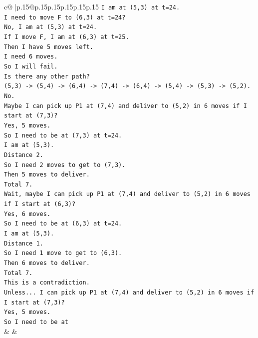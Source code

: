 \documentclass{article}
\begin{document}
{\begin{supertabular}{c@{$\;$}|p{.15\linewidth}@{}p{.15\linewidth}p{.15\linewidth}p{.15\linewidth}p{.15\linewidth}p{.15\linewidth}}
{{{\texttt{I am at (5,3) at t=24.} \\
\texttt{I need to move F to (6,3) at t=24?} \\
\texttt{No, I am at (5,3) at t=24.} \\
\texttt{If I move F, I am at (6,3) at t=25.} \\
\texttt{Then I have 5 moves left.} \\
\texttt{I need 6 moves.} \\
\texttt{So I will fail.} \\
\texttt{Is there any other path?} \\
\texttt{(5,3) {-}> (5,4) {-}> (6,4) {-}> (7,4) {-}> (6,4) {-}> (5,4) {-}> (5,3) {-}> (5,2).} \\
\texttt{No.} \\
\texttt{Maybe I can pick up P1 at (7,4) and deliver to (5,2) in 6 moves if I start at (7,3)?} \\
\texttt{Yes, 5 moves.} \\
\texttt{So I need to be at (7,3) at t=24.} \\
\texttt{I am at (5,3).} \\
\texttt{Distance 2.} \\
\texttt{So I need 2 moves to get to (7,3).} \\
\texttt{Then 5 moves to deliver.} \\
\texttt{Total 7.} \\
\texttt{Wait, maybe I can pick up P1 at (7,4) and deliver to (5,2) in 6 moves if I start at (6,3)?} \\
\texttt{Yes, 6 moves.} \\
\texttt{So I need to be at (6,3) at t=24.} \\
\texttt{I am at (5,3).} \\
\texttt{Distance 1.} \\
\texttt{So I need 1 move to get to (6,3).} \\
\texttt{Then 6 moves to deliver.} \\
\texttt{Total 7.} \\
\texttt{This is a contradiction.} \\
\texttt{Unless... I can pick up P1 at (7,4) and deliver to (5,2) in 6 moves if I start at (7,3)?} \\
\texttt{Yes, 5 moves.} \\
\texttt{So I need to be at} \\
            }
        }
    }
    & & \\ \\


\end{supertabular}}
\end{document}
